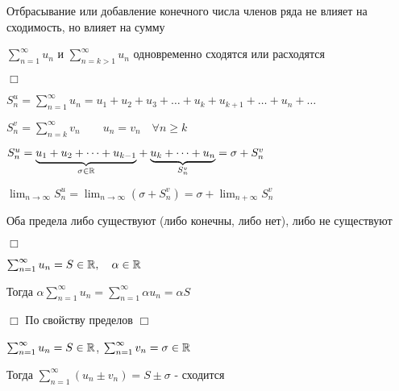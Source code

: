 \documentclass[12pt]{article}
\begin{document}
    \begin{MyTheorem}
         Отбрасывание или добавление конечного числа членов ряда не влияет на сходимость, но влияет на сумму

        $\sum_{n = 1}^\infty u_n$ и $\sum_{n = k > 1}^\infty u_n$ одновременно сходятся или расходятся
    \end{MyTheorem}

    \begin{tcolorbox}
        $\Box$

        $S^u_n = \sum_{n = 1}^{\infty} u_n = u_1 + u_2 + u_3 + \dots + u_k + u_{k + 1} + \dots + u_n + \dots$

        $S^v_n = \sum_{n = k}^\infty v_n \quad\quad u_n = v_n \quad \forall n \geq k$

        $S_n^u = \underset{\sigma \in \mathbb{R}}{\underbrace{u_1 + u_2 + \dots + u_{k - 1}}} + \underset{S^v_n}{\underbrace{u_{k} + \dots + u_n}} = \sigma + S^v_n$

        $\lim_{n \to \infty} S_n^u = \lim_{n \to \infty} (\sigma + S^v_n) = \sigma + \lim_{n + \infty} S_n^v$

        \smallvspace

        Оба предела либо существуют (либо конечны, либо нет), либо не существуют


%

        $\Box$
    \end{tcolorbox}

    \begin{MyTheorem}
         $\sum_{n = 1}^\infty u_n = S \in \mathbb{R}, \quad \alpha \in \mathbb{R}$

        Тогда $\alpha \sum_{n = 1}^\infty u_n = \sum_{n = 1}^\infty \alpha u_n = \alpha S$
    \end{MyTheorem}

    \begin{tcolorbox}
        $\Box$ По свойству пределов $\Box$
    \end{tcolorbox}

    \begin{MyTheorem}
         $\sum_{n = 1}^\infty u_n = S \in \mathbb{R}$, $\sum_{n = 1}^\infty v_n = \sigma \in \mathbb{R}$

        Тогда $\sum_{n = 1}^\infty (u_n \pm v_n) = S \pm \sigma$ - сходится
    \end{MyTheorem}
\end{document}
